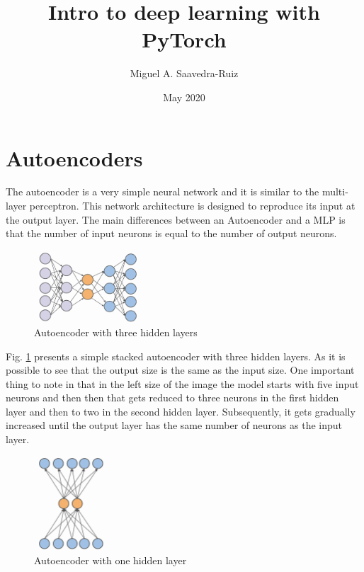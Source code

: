 \documentclass{article}
\title{Intro to deep learning with PyTorch}
\author{Miguel A. Saavedra-Ruiz}
\date{May 2020}
\begin{document}
\maketitle

\section*{Autoencoders}

The autoencoder is a very simple neural network and it is similar to the multi-layer perceptron. This network architecture is designed to reproduce its input at the output layer. The main differences between an Autoencoder and a MLP is that the number of input neurons is equal to the number of output neurons. 

\begin{figure}[ht]
    \centering
    \includegraphics[width=0.35\textwidth,height=0.35\textheight,keepaspectratio]{images/auto.png}
    \captionsetup{justification=centering}
    \caption{Autoencoder with three hidden layers}
    \label{fig:f1}
\end{figure}

Fig. \ref{fig:f1} presents a simple stacked autoencoder with three hidden layers. As it is possible to see that the output size is the same as the input size. One important thing to note in that in the left size of the image the model starts with five input neurons and then then that gets reduced to three neurons in the first hidden layer and then to two in the second hidden layer. Subsequently, it gets gradually increased until the output layer has the same number of neurons as the input layer.

\begin{figure}[ht]
    \centering
    \includegraphics[width=0.25\textwidth,height=0.25\textheight,keepaspectratio]{images/simple_auto.png}
    \captionsetup{justification=centering}
    \caption{Autoencoder with one hidden layer}
    \label{fig:f2}
\end{figure}
\end{document}
